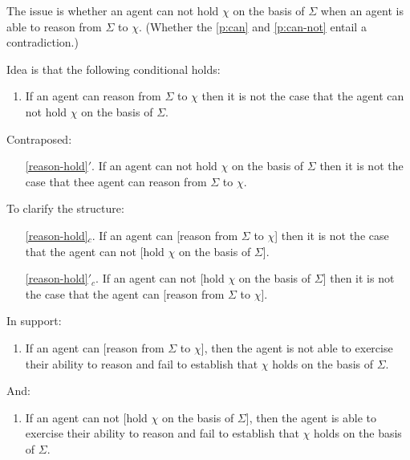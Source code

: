 \documentclass[10pt]{article}
\newcommand{\hozlinedash}[0]{%
  \noindent\hdashrule[0.5ex][c]{\textwidth}{.1pt}{2.5pt}
}
\begin{document}
The issue is whether an agent can not hold \(\chi\) on the basis of \(\Sigma\) when an agent is able to reason from \(\Sigma\) to \(\chi\).
(Whether the \ref{p:can} and \ref{p:can-not} entail a contradiction.)

\hozlinedash

\newpage

Idea is that the following conditional holds:

\begin{enumerate}[label=H\arabic*., ref=H\arabic*]
\item\label{reason-hold} If an agent can reason from \(\Sigma\) to \(\chi\) then it is not the case that the agent can not hold \(\chi\) on the basis of \(\Sigma\).
\end{enumerate}

Contraposed:

\begin{enumerate}
\item[\ref{reason-hold}\('\).] If an agent can not hold \(\chi\) on the basis of \(\Sigma\) then it is not the case that thee agent can reason from \(\Sigma\) to \(\chi\).
\end{enumerate}

To clarify the structure:

\begin{enumerate}
\item[\ref{reason-hold}\(_{c}\).] If an agent can [reason from \(\Sigma\) to \(\chi\)] then it is not the case that the agent can not [hold \(\chi\) on the basis of \(\Sigma\)].
\item[\ref{reason-hold}\('_{c}\).] If an agent can not [hold \(\chi\) on the basis of \(\Sigma\)] then it is not the case that the agent can [reason from \(\Sigma\) to \(\chi\)].
\end{enumerate}

\hozlinedash

In support:

\begin{enumerate}[label=R\arabic*., ref=R\arabic*.]
\item\label{r:1} If an agent can [reason from \(\Sigma\) to \(\chi\)], then the agent is not able to exercise their ability to reason and fail to establish that \(\chi\) holds on the basis of \(\Sigma\).
\end{enumerate}

And:

\begin{enumerate}[label=R\arabic*., ref=R\arabic*., resume]
\item\label{r:2} If an agent can not [hold \(\chi\) on the basis of \(\Sigma\)], then the agent is able to exercise their ability to reason and fail to establish that \(\chi\) holds on the basis of \(\Sigma\).
\end{enumerate}
\end{document}
